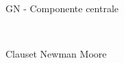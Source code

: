 \documentclass[12pt,a4paper,twoside]{report}
\begin{document}
\begin{figure}[ht]
\begin{subfigure}[b]{0.5\textwidth}
            \caption{GN - Componente centrale}
        \end{subfigure}
        \\
        \begin{subfigure}[b]{0.5\textwidth}
            \centering
            \setlength{\fboxrule}{0pt} %
            \caption{Clauset Newman Moore}
        \end{subfigure}%
        ~
        \begin{subfigure}[b]{0.5\textwidth}
            \centering
            \setlength{\fboxrule}{0pt} %

\end{subfigure}
\end{figure}
\end{document}
